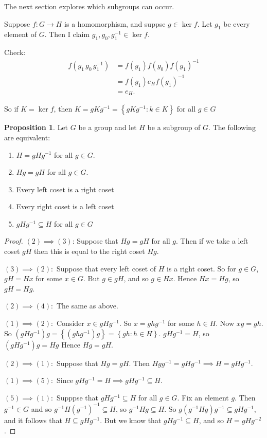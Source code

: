 \documentclass{article}
\theoremstyle{definition}
\newtheorem{proposition}{Proposition}
\newcommand{\func}[3]{#1 : #2 \rightarrow #3}
\begin{document}
The next section explores which subgroups can occur.

Suppose $\func{f}{G}{H}$ is a homomorphism, and suppse $g \in \ker f$. Let $g_1$ be every element of $G$. Then I claim $g_1,g_0,g_1^{-1}\in \ker f$.

Check: 
\begin{align*}
  f(g_1\,g_0\,g_1^{-1}) &= f(g_1)f(g_0)f(g_1)^{-1}\\
  &= f(g_1)e_Hf(g_1)^{-1} \\
  &= e_H.
\end{align*}

So if $K=\ker f$, then $K=gKg^{-1}=\left\{ gKg^{-1} : k \in K \right\}$ for all $g \in G$

\begin{proposition}
  Let $G$ be a group and let $H$ be a subgroup of $G$. The following are equivalent:
  \begin{enumerate}
    \item $H=gHg^{-1}$ for all $g \in G$.
    \item $Hg=gH$ for all $g \in G$.
    \item Every left coset is a right coset
    \item Every right coset is a left coset
    \item $gHg^{-1} \subseteq H$ for all $g \in G$
  \end{enumerate}
\end{proposition}

\begin{proof}
  $(2) \implies (3)$: Suppose that $Hg=gH$ for all $g$. Then if we take a left coset $gH$ then this is equal to the right coset $Hg$.

  $(3)\implies(2):$ Suppose that every left coset of $H$ is a right coset. So for $g \in G$, $gH=Hx$ for some $x \in G$. But $g \in gH$, and so $g \in Hx$. Hence $Hx=Hg$, so $gH=Hg$.

  $(2)\implies(4):$ The same as above.

  $(1)\implies(2):$ 
  Consider $x \in gHg^{-1}$. So $x=ghg^{-1}$ for some $h \in H$. Now $xg=gh$. So $(gHg^{-1})g=\left\{ (ghg^{-1}) g \right\}=\left\{ gh : h \in H \right\}. $ $gHg^{-1}=H$, so $(gHg^{-1})g=Hg$ Hence $Hg = gH$.

  $(2)\implies(1):$ Suppose that $Hg=gH$. Then $Hgg^{-1}=gHg^{-1} \implies H=gHg^{-1}$.

  $(1) \implies (5):$ Since $gHg^{-1}=H \implies gHg^{-1} \subseteq H$.

  $(5) \implies (1):$ Supppse that $gHg^{-1}\subseteq H$ for all $g \in G$. Fix an element $g$. Then $g^{-1} \in G$ and so $g^{-1}H\left( g^{-1} \right)^{-1} \subseteq H$, so $g^{-1}Hg \subseteq H$. So $g\left( g^{-1}Hg \right)g^{-1} \subseteq gHg^{-1}$, and it follows that $H \subseteq gHg^{-1}$. But we know that $gHg^{-1} \subseteq H$, and so $H=gHg^{-2}$.
\end{proof}
\end{document}
